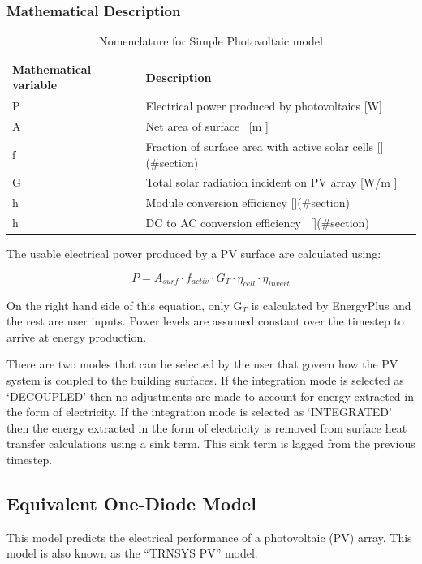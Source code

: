 \subsubsection{Mathematical Description}\label{mathematical-description}

\begin{longtable}[c]{p{1.51in}p{4.48in}}
\caption{Nomenclature for Simple Photovoltaic model \protect \label{table:nomenclature-for-simple-photovoltaic-model}}\\
\toprule 
Mathematical variable & Description \tabularnewline \midrule
\endhead
P & Electrical power produced by photovoltaics [W] \tabularnewline
A & Net area of surface~ [m  ] \tabularnewline
f & Fraction of surface area with active solar cells [](\#section) \tabularnewline
G & Total solar radiation incident on PV array [W/m  ] \tabularnewline
h & Module conversion efficiency [](\#section) \tabularnewline
h & DC to AC conversion efficiency~ [](\#section) \tabularnewline
\bottomrule
\end{longtable}

The usable electrical power produced by a PV surface are calculated using:

\begin{equation}
P = {A_{surf}} \cdot {f_{activ}} \cdot {G_T} \cdot {\eta_{cell}} \cdot {\eta_{invert}}
\end{equation}

On the right hand side of this equation, only G\(_{T}\) is calculated by EnergyPlus and the rest are user inputs. Power levels are assumed constant over the timestep to arrive at energy production.

There are two modes that can be selected by the user that govern how the PV system is coupled to the building surfaces. If the integration mode is selected as `DECOUPLED' then no adjustments are made to account for energy extracted in the form of electricity. If the integration mode is selected as `INTEGRATED' then the energy extracted in the form of electricity is removed from surface heat transfer calculations using a sink term. This sink term is lagged from the previous timestep.

\subsection{Equivalent One-Diode Model}\label{equivalent-one-diode-model}

This model predicts the electrical performance of a photovoltaic (PV) array. This model is also known as the ``TRNSYS PV'' model.

